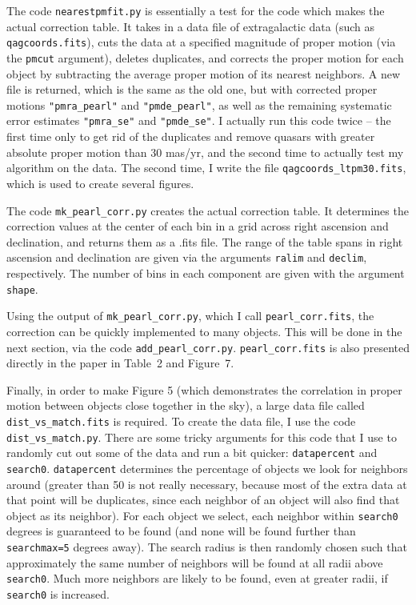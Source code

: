 \documentclass{article}
\begin{document}
The code \texttt{nearestpmfit.py} is essentially a test for the code which makes the actual correction table. It takes in a data file of extragalactic data (such as \texttt{qagcoords.fits}), cuts the data at a specified magnitude of proper motion (via the \texttt{pmcut} argument), deletes duplicates, and corrects the proper motion for each object by subtracting the average proper motion of its nearest neighbors. A new file is returned, which is the same as the old one, but with corrected proper motions \texttt{"pmra\_pearl"} and \texttt{"pmde\_pearl"}, as well as the remaining systematic error estimates \texttt{"pmra\_se"} and \texttt{"pmde\_se"}. I actually run this code twice -- the first time only to get rid of the duplicates and remove quasars with greater absolute proper motion than 30 mas/yr, and the second time to actually test my algorithm on the data. The second time, I write the file \texttt{qagcoords\_ltpm30.fits}, which is used to create several figures.

The code \texttt{mk\_pearl\_corr.py} creates the actual correction table. It determines the correction values at the center of each bin in a grid across right ascension and declination, and returns them as a .fits file. The range of the table spans in right ascension and declination are given via the arguments \texttt{ralim} and \texttt{declim}, respectively. The number of bins in each component are given with the argument \texttt{shape}.

Using the output of \texttt{mk\_pearl\_corr.py}, which I call \texttt{pearl\_corr.fits}, the correction can be quickly implemented to many objects. This will be done in the next section, via the code \texttt{add\_pearl\_corr.py}. \texttt{pearl\_corr.fits} is also presented directly in the paper in Table~2 and Figure~7.

Finally, in order to make Figure 5 (which demonstrates the correlation in proper motion between objects close together in the sky), a large data file called \texttt{dist\_vs\_match.fits} is required. To create the data file, I use the code \texttt{dist\_vs\_match.py}. There are some tricky arguments for this code that I use to randomly cut out some of the data and run a bit quicker: \texttt{datapercent} and \texttt{search0}. \texttt{datapercent} determines the percentage of objects we look for neighbors around (greater than 50 is not really necessary, because most of the extra data at that point will be duplicates, since each neighbor of an object will also find that object as its neighbor). For each object we select, each neighbor within \texttt{search0} degrees is guaranteed to be found (and none will be found further than \texttt{searchmax=5} degrees away). The search radius is then randomly chosen such that approximately the same number of neighbors will be found at all radii above \texttt{search0}. Much more neighbors are likely to be found, even at greater radii, if \texttt{search0} is increased.
\end{document}
